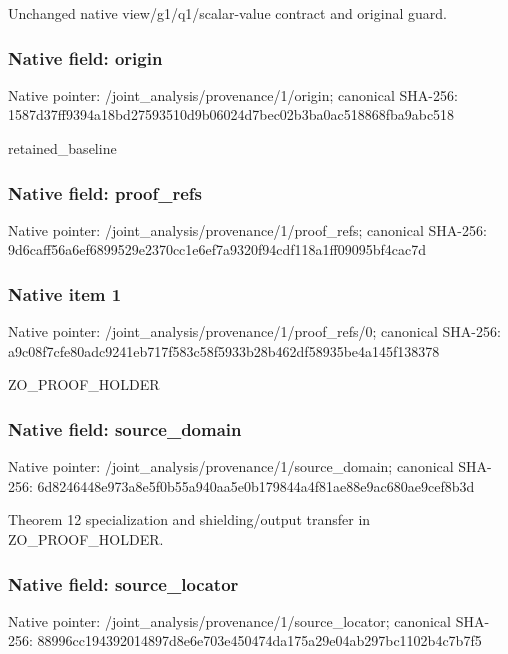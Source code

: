 \documentclass[10pt,a4paper]{article}
\begin{document}
\begingroup\raggedright\sloppy Unchanged native view/\allowbreak{}g1/\allowbreak{}q1/\allowbreak{}scalar-value contract and original guard.\par\endgroup

\subsubsection{Native field: origin}
Native pointer: /joint\_\allowbreak{}analysis/provenance/1/origin; canonical SHA-256: 1587d37ff9394a18bd27593510d9b06024d7bec02b3ba0ac518868fba9abc518

\begingroup\raggedright\sloppy retained\_\allowbreak{}baseline\par\endgroup

\subsubsection{Native field: proof\_\allowbreak{}refs}
Native pointer: /joint\_\allowbreak{}analysis/provenance/1/proof\_\allowbreak{}refs; canonical SHA-256: 9d6caff56a6ef6899529e2370cc1e6ef7a9320f94cdf118a1ff09095bf4cac7d

\subsubsection{Native item 1}
Native pointer: /joint\_\allowbreak{}analysis/provenance/1/proof\_\allowbreak{}refs/0; canonical SHA-256: a9c08f7cfe80adc9241eb717f583c58f5933b28b462df58935be4a145f138378

\begingroup\raggedright\sloppy ZO\_\allowbreak{}PROOF\_\allowbreak{}HOLDER\par\endgroup

\subsubsection{Native field: source\_\allowbreak{}domain}
Native pointer: /joint\_\allowbreak{}analysis/provenance/1/source\_\allowbreak{}domain; canonical SHA-256: 6d8246448e973a8e5f0b55a940aa5e0b179844a4f81ae88e9ac680ae9cef8b3d

\begingroup\raggedright\sloppy Theorem 12 specialization and shielding/\allowbreak{}output transfer in ZO\_\allowbreak{}PROOF\_\allowbreak{}HOLDER.\par\endgroup

\subsubsection{Native field: source\_\allowbreak{}locator}
Native pointer: /joint\_\allowbreak{}analysis/provenance/1/source\_\allowbreak{}locator; canonical SHA-256: 88996cc194392014897d8e6e703e450474da175a29e04ab297bc1102b4c7b7f5
\end{document}

